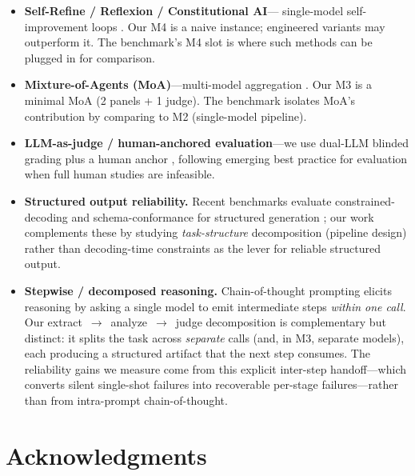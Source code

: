 \documentclass[11pt]{article}
\begin{document}
\begin{itemize}
  \item \textbf{Self-Refine / Reflexion / Constitutional AI}---
        single-model self-improvement loops
        \citep{madaan2023selfrefine,shinn2023reflexion,bai2022constitutional}.
        Our M4 is a naive instance; engineered variants may outperform it. The
        benchmark's M4 slot is where such methods can be plugged in for
        comparison.
  \item \textbf{Mixture-of-Agents (MoA)}---multi-model aggregation
        \citep{wang2024mixtureofagents}. Our M3 is a minimal MoA (2 panels + 1
        judge). The benchmark isolates MoA's contribution by comparing to M2
        (single-model pipeline).
  \item \textbf{LLM-as-judge / human-anchored evaluation}---we use dual-LLM
        blinded grading plus a human anchor \citep{zheng2023llmjudge}, following
        emerging best practice for evaluation when full human studies are
        infeasible.
  \item \textbf{Structured output reliability.} Recent benchmarks evaluate
        constrained-decoding and schema-conformance for structured generation
        \citep{geng2025jsonschemabench}; our work complements these by studying
        \emph{task-structure} decomposition (pipeline design) rather than
        decoding-time constraints as the lever for reliable structured output.
  \item \textbf{Stepwise / decomposed reasoning.} Chain-of-thought prompting
        \citep{wei2022chainofthought} elicits reasoning by asking a single model
        to emit intermediate steps \emph{within one call}. Our extract~$\rightarrow$~analyze~$\rightarrow$~judge
        decomposition is complementary but distinct: it splits the task across
        \emph{separate} calls (and, in M3, separate models), each producing a
        structured artifact that the next step consumes. The reliability gains we
        measure come from this explicit inter-step handoff---which converts silent
        single-shot failures into recoverable per-stage failures---rather than from
        intra-prompt chain-of-thought.
\end{itemize}

\section*{Acknowledgments}
\end{document}
